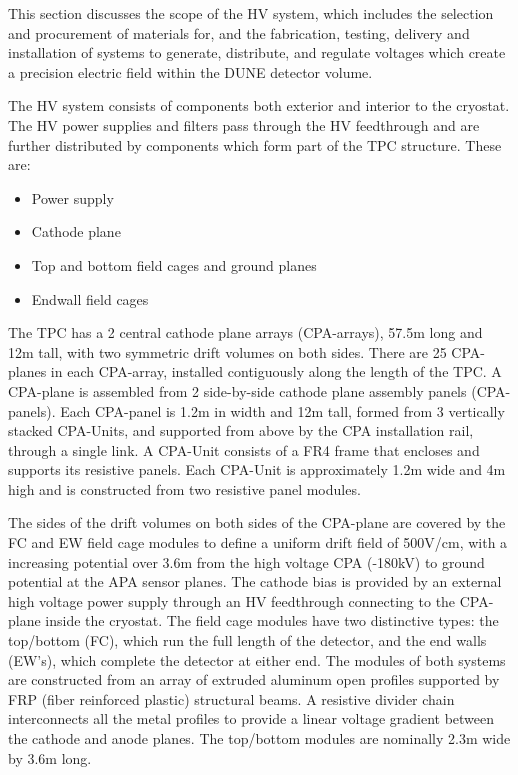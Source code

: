 This section discusses the  scope of the HV system, which includes the selection and procurement of materials for, and the fabrication, testing, delivery and installation of systems to generate, distribute, and regulate voltages which create a precision electric field within the DUNE detector volume. 

The HV system consists of components both exterior and interior to the cryostat. The HV power supplies and filters pass through the HV feedthrough and are further distributed by components which form part of the TPC structure. These are:
\begin{itemize}
\item Power supply
\item Cathode plane
\item Top and bottom field cages and ground planes
\item Endwall field cages 
\end{itemize}
The TPC has a 2 central cathode plane arrays (CPA-arrays), 57.5m long and 12m tall, with two symmetric drift volumes on both sides. There are 25 CPA-planes in each CPA-array, installed contiguously along the length of the TPC. A CPA-plane is assembled from 2 side-by-side cathode plane assembly panels (CPA-panels). Each CPA-panel is 1.2m in width and 12m tall, formed from 3 vertically stacked CPA-Units, and supported from above by the CPA installation rail, through a single link.
A CPA-Unit consists of a FR4 frame that encloses and supports its resistive panels.  Each CPA-Unit is approximately 1.2m wide and 4m high and is constructed from two resistive panel modules.

The sides of the drift volumes on both sides of the CPA-plane are covered by the FC and EW field cage modules to define a uniform drift field of 500V/cm, with a increasing potential over 3.6m from the high voltage CPA (-180kV) to ground potential at the APA sensor planes. The cathode bias is provided by an external high voltage power supply through an HV feedthrough connecting to the CPA-plane inside the cryostat.
The field cage modules have two distinctive types: the top/bottom (FC), which run the full length of the detector, and the end walls (EW's), which complete the detector at either end. The modules of both systems are constructed from an array of extruded aluminum open profiles supported by FRP (fiber reinforced plastic) structural beams. A resistive divider chain interconnects all the metal profiles to provide a linear voltage gradient between the cathode and anode planes.  The top/bottom modules are nominally 2.3m wide by 3.6m long. 

